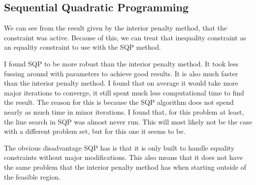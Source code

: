 \documentclass[12pt,parskip=full]{article}
\numberwithin{subsection}{section}
\begin{document}
		\subsection{Sequential Quadratic Programming}
		
			We can see from the result given by the interior penalty method, that the constraint was active. Because
			of this, we can treat that inequality constraint as an equality constraint to use with the SQP method.
			
			I found SQP to be more robust than the interior penalty method. It took less fussing around with parameters
			to achieve good results. It is also much faster than the interior penalty method. I found that on average it
			would take more major iterations to converge, it still spent much less computational time to find the result.
			The reason for this is because the SQP algorithm does not spend nearly as much time in minor iterations. I
			found that, for this problem at least, the line search in SQP was almost never run. This will most likely
			not be the case with a different problem set, but for this one it seems to be.
			
			The obvious disadvantage SQP has is that it is only built to handle equality constraints without major
			modifications. This also means that it does not have the same problem that the interior penalty method
			has when starting outside of the feasible region.
			
\end{document}
